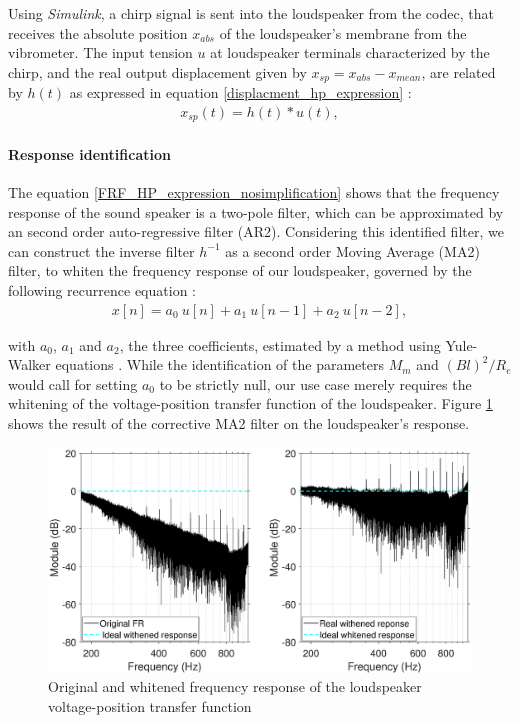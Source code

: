 \documentclass[11pt, twocolumn]{article}
\begin{document}
Using \textit{Simulink}, a chirp signal is sent into the loudspeaker from the codec, that receives the absolute position $x_{abs}$ of the loudspeaker's membrane from the vibrometer.
The input tension $u$ at loudspeaker terminals characterized by the chirp, and the real output displacement given by $x_{sp} = x_{abs} - x_{mean}$, are related by $h(t)$ as expressed in equation \eqref{displacment_hp_expression} : 
\begin{align}
    x_{sp}(t) = h(t) * u(t),
    \label{displacment_hp_expression}
\end{align}

\paragraph{Response identification} The equation \eqref{FRF_HP_expression_nosimplification} shows that the frequency response of the sound speaker is a two-pole filter, which can be approximated by an second order auto-regressive filter (AR2).
Considering this identified filter, we can construct the inverse filter $h^{-1}$ as a second order Moving Average (MA2) filter, to whiten the frequency response of our loudspeaker, governed by the following recurrence equation : 
\begin{align}
    x[n] = a_0 \: u[n] + a_1 \: u[n-1] + a_2 \: u[n-2],
\end{align}

with $a_0$, $a_1$ and $a_2$, the three coefficients, estimated by a method using Yule-Walker equations \cite{cours_fpa_tns}.
While the identification of the parameters $M_m$ and $(Bl)^2/R_e$ would call for setting $a_0$ to be strictly null, our use case merely requires the whitening of the voltage-position transfer function of the loudspeaker.
\noindent
Figure \ref{fig:fig_frf} shows the result of the corrective MA2 filter on the loudspeaker's response.

\begin{figure}[H]
    \centering
    \includegraphics[scale= 0.25]{compar_FRF_avec_withened_FRF_HP.eps}
    \caption{Original and whitened frequency response of the loudspeaker voltage-position transfer function}
    \label{fig:fig_frf}
\end{figure}
\end{document}
